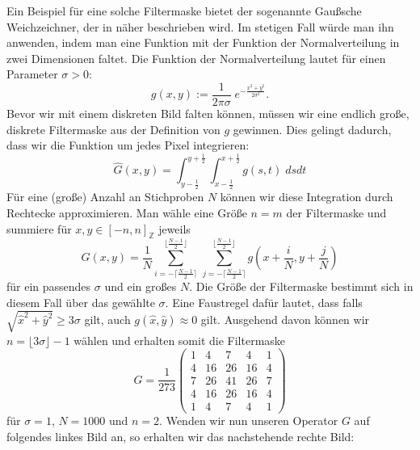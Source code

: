 \documentclass[a4paper, 11pt]{report}
\theoremstyle{definition}
\begin{document}
		Ein Beispiel für eine solche Filtermaske bietet der sogenannte Gaußsche Weichzeichner, der in \cite{gaussianblur} näher beschrieben wird. Im stetigen Fall würde man ihn anwenden, indem man eine Funktion mit der Funktion der Normalverteilung in zwei Dimensionen faltet. Die Funktion der Normalverteilung lautet für einen Parameter $\sigma > 0$:
		$$ g(x,y) := \frac{1}{2 \pi \sigma} \;e ^{-\frac{x^2 + y^2}{2\sigma^2}}. $$
		Bevor wir mit einem diskreten Bild falten können, müssen wir eine endlich große, diskrete Filtermaske aus der Definition von $g$ gewinnen. Dies gelingt dadurch, dass wir die Funktion um jedes Pixel integrieren:
		$$\hat G(x,y) = \int_{y-\frac{1}{2}}^{y+\frac{1}{2}} \int_{x-\frac{1}{2}}^{x+\frac{1}{2}} g(s,t) \; ds dt$$
		Für eine (große) Anzahl an Stichproben $N$ können wir diese Integration durch Rechtecke approximieren.
		Man wähle eine Größe $n = m$ der Filtermaske und summiere für $x,y \in [-n, n]_\mathbb{Z}$ jeweils
		$$G(x,y) = \frac{1}{N}\sum_{i=-\lceil\frac{N-1}{2}\rceil}^{\lfloor\frac{N-1}{2}\rfloor}\, \sum_{j=-\lceil\frac{N-1}{2}\rceil}^{\lfloor\frac{N-1}{2}\rfloor} g(x+\frac{i}{N},y+\frac{j}{N})$$
		für ein passendes $\sigma$ und ein großes $N$.
		Die Größe der Filtermaske bestimmt sich in diesem Fall über das gewählte $\sigma$. Eine Faustregel dafür lautet, dass falls $\sqrt{\hat x^2 + \hat y^2} \geq 3\sigma$ gilt, auch $g(\hat x,\hat y) \approx 0$ gilt. Ausgehend davon können wir $n = \lfloor3\sigma\rfloor-1$ wählen und erhalten somit die Filtermaske
		$$G = \frac{1}{273}
		\begin{pmatrix}
			1&4&7&4&1\\
			4&16&26&16&4\\
			7&26&41&26&7\\
			4&16&26&16&4\\
			1&4&7&4&1
		\end{pmatrix}$$
 		für $\sigma = 1$, $N = 1000$ und $n = 2$. Wenden wir nun unseren Operator $G$ auf folgendes linkes Bild an, so erhalten wir das nachstehende rechte Bild:
\end{document}
